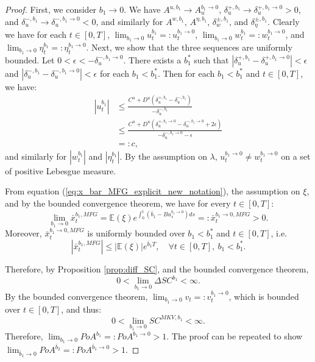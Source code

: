 \documentclass[11pt]{article}
\begin{document}
\begin{proof}
	First, we consider $b_1 \to 0$. We have $A^{u,b_1} \to A^{b_1\to 0}_u$, $\delta^{+,b_1}_u \to \delta^{+,b_1\to 0}_u>0$, and $\delta^{-,b_1}_u \to \delta^{-,b_1\to 0}_u<0$, and similarly for $A^{w,b_1}$, $A^{\eta,b_1}$, $\delta^{\pm,b_1}_w$, and $\delta^{\pm,b_1}_\eta$. Clearly we have for each $t\in[0,T]$, $\lim_{b_1 \to 0}u^{b_1}_t=:u^{b_1\to 0}_t$, $\lim_{b_1 \to 0}w^{b_1}_t=:w^{b_1 \to 0}_t$, and $\lim_{b_1 \to 0}\eta^{b_1}_t=:\eta^{b_1 \to 0}_t$. Next, we show that the three sequences are uniformly bounded. Let $0<\epsilon<-\delta^{-,b_1\to 0}_u$. There exists a $b_1^*$ such that $\left| \delta^{+,b_1}_u-\delta^{+,b_1\to0}_u \right|<\epsilon$ and $\left| \delta^{-,b_1}_u-\delta^{-,b_1\to0}_u \right|<\epsilon$ for each $b_1<b_1^*$. Then for each $b_1<b_1^*$ and $t\in[0,T]$, we have:
	\begin{equation*}
	\begin{split}
		\left|u^{b_1}_t\right| &\leq \frac{C^u+D^u\left(\delta^{+,b_1}_u-\delta^{-,b_1}_u\right) }{-\delta^{-,b_1}_u} \\
		&\leq \frac{C^u+D^u\left(\delta^{+,b_1\to 0}_u-\delta^{-,b_1 \to 0}_u+2\epsilon\right) }{-\delta^{-,b_1\to 0}_u-\epsilon}\\
		&=:c,
	\end{split}
	\end{equation*}
	and similarly for $\left|w^{b_1}_t\right|$ and $\left|\eta^{b_1}_t\right|$. By the assumption on $\lambda$, $u^{b_1\to 0}_t \neq w^{b_1\to 0}_t$ on a set of positive Lebesgue measure.
	
	From equation (\ref{eq:x_bar_MFG_explicit_new_notation}), the assumption on $\xi$, and by the bounded convergence theorem, we have for every $t \in [0,T]$:
	\begin{equation*}
	\lim_{b_1\to 0}\bar{x}_t^{b_1,MFG} = \mathbb{E}(\xi) e^{\int_0^t(\bar{b}_1-B u^{b_1\to 0}_s)ds} =: \bar{x}_t^{b_1\to 0,MFG}>0.
	\end{equation*}
	Moreover, $\bar{x}_t^{b_1\to 0,MFG}$ is uniformly bounded over $b_1<b_1^*$ and $t \in [0,T]$, i.e. 
	$$ \left| \bar{x}^{b_1,MFG}_t \right| \leq \vert \mathbb{E}(\xi) \vert e^{ \bar{b}_1 T }, \quad \forall t \in [0,T],\ b_1<b_1^*. $$ 
	
	Therefore, by Proposition \ref{prop:diff_SC}, and the bounded convergence theorem,
    \begin{equation*}
        0<\lim_{b_1 \to 0} \Delta SC^{b_1}<\infty.
    \end{equation*}
    By the bounded convergence theorem, $\lim_{b_1 \to 0}v_t=:v_t^{b_1 \to 0}$, which is bounded over $t\in [0,T]$, and thus:
    $$0<\lim_{b_1 \to 0} SC^{MKV,b_1}<\infty.$$
    Therefore, $\lim_{b_1 \to 0} PoA^{b_1} =: PoA^{b_1 \to 0} > 1$. The proof can be repeated to show $\lim_{\bar{b}_1 \to 0} PoA^{\bar{b}_2} =: PoA^{\bar{b}_1 \to 0} > 1$.
    

\end{proof}
\end{document}
